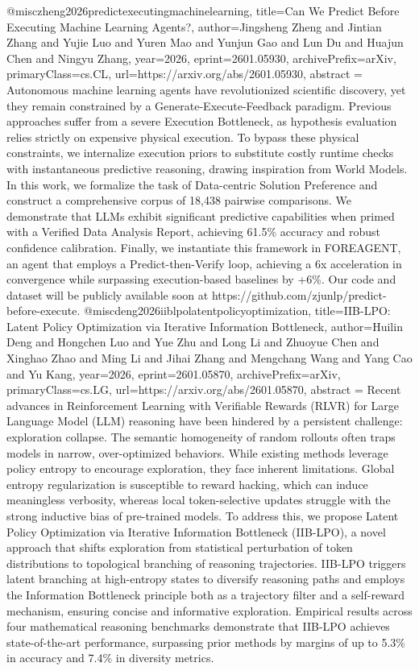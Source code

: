 {}@misc{zheng2026predictexecutingmachinelearning,
      title={Can We Predict Before Executing Machine Learning Agents?}, 
      author={Jingsheng Zheng and Jintian Zhang and Yujie Luo and Yuren Mao and Yunjun Gao and Lun Du and Huajun Chen and Ningyu Zhang},
      year={2026},
      eprint={2601.05930},
      archivePrefix={arXiv},
      primaryClass={cs.CL},
      url={https://arxiv.org/abs/2601.05930},
      abstract = {Autonomous machine learning agents have revolutionized scientific discovery, yet they remain constrained by a Generate-Execute-Feedback paradigm. Previous approaches suffer from a severe Execution Bottleneck, as hypothesis evaluation relies strictly on expensive physical execution. To bypass these physical constraints, we internalize execution priors to substitute costly runtime checks with instantaneous predictive reasoning, drawing inspiration from World Models. In this work, we formalize the task of Data-centric Solution Preference and construct a comprehensive corpus of 18,438 pairwise comparisons. We demonstrate that LLMs exhibit significant predictive capabilities when primed with a Verified Data Analysis Report, achieving 61.5\% accuracy and robust confidence calibration. Finally, we instantiate this framework in FOREAGENT, an agent that employs a Predict-then-Verify loop, achieving a 6x acceleration in convergence while surpassing execution-based baselines by +6\%. Our code and dataset will be publicly available soon at https://github.com/zjunlp/predict-before-execute.}
}@misc{deng2026iiblpolatentpolicyoptimization,
      title={IIB-LPO: Latent Policy Optimization via Iterative Information Bottleneck}, 
      author={Huilin Deng and Hongchen Luo and Yue Zhu and Long Li and Zhuoyue Chen and Xinghao Zhao and Ming Li and Jihai Zhang and Mengchang Wang and Yang Cao and Yu Kang},
      year={2026},
      eprint={2601.05870},
      archivePrefix={arXiv},
      primaryClass={cs.LG},
      url={https://arxiv.org/abs/2601.05870},
      abstract = {Recent advances in Reinforcement Learning with Verifiable Rewards (RLVR) for Large Language Model (LLM) reasoning have been hindered by a persistent challenge: exploration collapse. The semantic homogeneity of random rollouts often traps models in narrow, over-optimized behaviors. While existing methods leverage policy entropy to encourage exploration, they face inherent limitations. Global entropy regularization is susceptible to reward hacking, which can induce meaningless verbosity, whereas local token-selective updates struggle with the strong inductive bias of pre-trained models. To address this, we propose Latent Policy Optimization via Iterative Information Bottleneck (IIB-LPO), a novel approach that shifts exploration from statistical perturbation of token distributions to topological branching of reasoning trajectories. IIB-LPO triggers latent branching at high-entropy states to diversify reasoning paths and employs the Information Bottleneck principle both as a trajectory filter and a self-reward mechanism, ensuring concise and informative exploration. Empirical results across four mathematical reasoning benchmarks demonstrate that IIB-LPO achieves state-of-the-art performance, surpassing prior methods by margins of up to 5.3\% in accuracy and 7.4\% in diversity metrics.}
}
